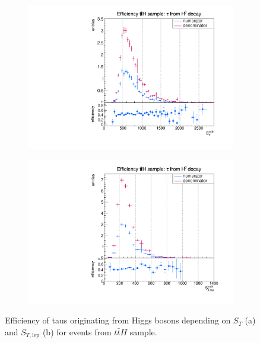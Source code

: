 \begin{figure}
  \centering
                \begin{subfigure}[t]{0.49\textwidth}
                \includegraphics[width=\textwidth]{figures/plots/ttH/Divided_fromHST.pdf}
                \label{Divided:fromH:ST}
                \end{subfigure}
                \begin{subfigure}[t]{0.49\textwidth}
                \includegraphics[width=\textwidth]{figures/plots/ttH/Divided_fromHSTlep.pdf}
                \label{Divided:fromH:STlep}
                \end{subfigure}
\caption[Efficiency of taus originating from Higgs bosons for events from $t\bar{t}H$ sample.]{Efficiency of taus originating from Higgs bosons depending on $S_{T}$ (a) and $S_{T,\text{lep}}$ (b) for events from $t\bar{t}H$ sample.}
\label{Divided:fromH:STgedöns}
\end{figure}
